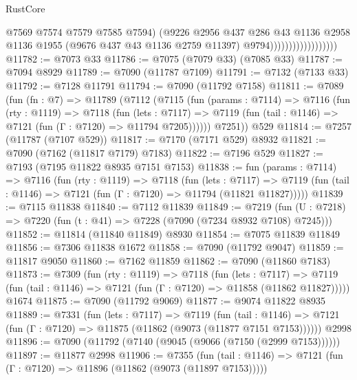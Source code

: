 \begin{lexlean}{RustCore}
\begin{coremodule}
                                        @7569
                                        @7574
                                        @7579
                                        @7585
                                        @7594)
                                      (@9226
                                        @2956
                                        @437
                                        @286
                                        @43
                                        @1136
                                        @2958
                                        @1136
                                        @1955
                                        (@9676 @437 @43 @1136 @2759 @11397)
                                        @9794))))))))))))))))))
@11782 := @7073 @33
@11786 := @7075 (@7079 @33) (@7085 @33)
@11787 := @7094 @8929
@11789 := @7090 (@11787 @7109)
@11791 := @7132 (@7133 @33)
@11792 := @7128 @11791
@11794 := @7090 (@11792 @7158)
@11811 := @7089
    (fun (fn : @7) =>
    @11789
      (@7112
        (@7115
          (fun (params : @7114) =>
          @7116
            (fun (rty : @1119) =>
            @7118
              (fun (lets : @7117) =>
              @7119 (fun (tail : @1146) => @7121 (fun (Γ : @7120) => @11794 @7205))))))
        @7251))
    @529
@11814 := @7257 (@11787 (@7107 @529))
@11817 := @7170 (@7171 @529) @8932
@11821 := @7090 (@7162 (@11817 @7179) @7183)
@11822 := @7196 @529
@11827 := @7193 (@7195 @11822 @8935 @7151 @7153)
@11838 := fun (params : @7114) =>
  @7116
    (fun (rty : @1119) =>
    @7118
      (fun (lets : @7117) =>
      @7119 (fun (tail : @1146) => @7121 (fun (Γ : @7120) => @11794 (@11821 @11827)))))
@11839 := @7115 @11838
@11840 := @7112 @11839
@11849 := @7219
    (fun (U : @7218) => @7220 (fun (t : @41) => @7228 (@7090 (@7234 @8932 @7108) @7245)))
@11852 := @11814 (@11840 @11849) @8930
@11854 := @7075 @11839 @11849
@11856 := @7306 @11838 @1672
@11858 := @7090 (@11792 @9047)
@11859 := @11817 @9050
@11860 := @7162 @11859
@11862 := @7090 (@11860 @7183)
@11873 := @7309
    (fun (rty : @1119) =>
    @7118
      (fun (lets : @7117) =>
      @7119 (fun (tail : @1146) => @7121 (fun (Γ : @7120) => @11858 (@11862 @11827)))))
    @1674
@11875 := @7090 (@11792 @9069)
@11877 := @9074 @11822 @8935
@11889 := @7331
    (fun (lets : @7117) =>
    @7119
      (fun (tail : @1146) =>
      @7121 (fun (Γ : @7120) => @11875 (@11862 (@9073 (@11877 @7151 @7153))))))
    @2998
@11896 := @7090 (@11792 (@7140 (@9045 (@9066 (@7150 (@2999 @7153))))))
@11897 := @11877 @2998
@11906 := @7355
    (fun (tail : @1146) => @7121 (fun (Γ : @7120) => @11896 (@11862 (@9073 (@11897 @7153)))))

\end{coremodule}
\end{lexlean}
